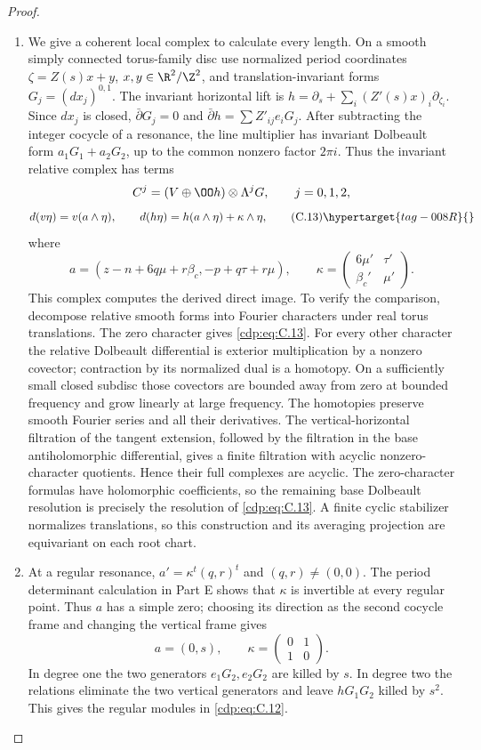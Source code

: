 \begin{proof}
\begin{enumerate}[label={$\langle1\rangle$\arabic*.},leftmargin=*]
\item We give a coherent local complex to calculate every length. On a smooth simply connected torus-family disc use normalized period coordinates $\zeta=Z(s)x+y$, $x,y\in\R^2/\Z^2$, and translation-invariant forms $G_j=(dx_j)^{0,1}$. The invariant horizontal lift is $h=\partial_s+\sum_i(Z'(s)x)_i\partial_{\zeta_i}$. Since $dx_j$ is closed, $\bar\partial G_j=0$ and
$\bar\partial h=\sum Z'_{ij}e_iG_j$. After subtracting the integer cocycle of a resonance, the line multiplier has invariant Dolbeault form $a_1G_1+a_2G_2$, up to the common nonzero factor $2\pi i$. Thus the invariant relative complex has terms
\[
 C^j=(V\oplus\OO h)\otimes\Lambda^jG,\qquad j=0,1,2,
\]
\[
 d(v\eta)=v(a\wedge\eta),\qquad
 d(h\eta)=h(a\wedge\eta)+\kappa\wedge\eta,             \tag{C.13}\hypertarget{tag-008R}{}\label{cdp:eq:C.13}
\]
where
\[
 a=(z-n+6q\mu+r\beta_c,-p+q\tau+r\mu),\qquad
 \kappa=\begin{pmatrix}6\mu'&\tau'\\\beta_c'&\mu'\end{pmatrix}.
\]
This complex computes the derived direct image. To verify the comparison, decompose relative smooth forms into Fourier characters under real torus translations. The zero character gives \eqref{cdp:eq:C.13}. For every other character the relative Dolbeault differential is exterior multiplication by a nonzero covector; contraction by its normalized dual is a homotopy. On a sufficiently small closed subdisc those covectors are bounded away from zero at bounded frequency and grow linearly at large frequency. The homotopies preserve smooth Fourier series and all their derivatives. The vertical-horizontal filtration of the tangent extension, followed by the filtration in the base antiholomorphic differential, gives a finite filtration with acyclic nonzero-character quotients. Hence their full complexes are acyclic. The zero-character formulas have holomorphic coefficients, so the remaining base Dolbeault resolution is precisely the resolution of \eqref{cdp:eq:C.13}. A finite cyclic stabilizer normalizes translations, so this construction and its averaging projection are equivariant on each root chart.

\item At a regular resonance, $a'=\kappa^t(q,r)^t$ and $(q,r)\ne(0,0)$. The period determinant calculation in Part E shows that $\kappa$ is invertible at every regular point. Thus $a$ has a simple zero; choosing its direction as the second cocycle frame and changing the vertical frame gives
\[
 a=(0,s),\qquad\kappa=\begin{pmatrix}0&1\\1&0\end{pmatrix}.
\]
In degree one the two generators $e_1G_2,e_2G_2$ are killed by $s$. In degree two the relations eliminate the two vertical generators and leave $hG_1G_2$ killed by $s^2$. This gives the regular modules in \eqref{cdp:eq:C.12}.


\end{enumerate}
\end{proof}
